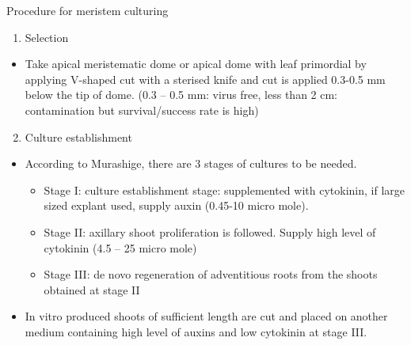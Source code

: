 \documentclass[
  ignorenonframetext,
  aspectratio=169]{beamer}
\providecommand{\tightlist}{%
  \setlength{\itemsep}{0pt}\setlength{\parskip}{0pt}}
\begin{document}
\begin{frame}{Procedure for meristem culturing}
\protect\hypertarget{procedure-for-meristem-culturing}{}
\begin{enumerate}
\tightlist
\item
  Selection
\end{enumerate}

\begin{itemize}
\tightlist
\item
  Take apical meristematic dome or apical dome with leaf primordial by
  applying V-shaped cut with a sterised knife and cut is applied 0.3-0.5
  mm below the tip of dome. (0.3 -- 0.5 mm: virus free, less than 2 cm:
  contamination but survival/success rate is high)
\end{itemize}
\end{frame}

\begin{frame}{}
\protect\hypertarget{section-15}{}
\begin{enumerate}
\setcounter{enumi}{1}
\tightlist
\item
  Culture establishment
\end{enumerate}

\begin{itemize}
\tightlist
\item
  According to Murashige, there are 3 stages of cultures to be needed.

  \begin{itemize}
  \tightlist
  \item
    Stage I: culture establishment stage: supplemented with cytokinin,
    if large sized explant used, supply auxin (0.45-10 micro mole).
  \item
    Stage II: axillary shoot proliferation is followed. Supply high
    level of cytokinin (4.5 -- 25 micro mole)
  \item
    Stage III: de novo regeneration of adventitious roots from the
    shoots obtained at stage II
  \end{itemize}
\item
  In vitro produced shoots of sufficient length are cut and placed on
  another medium containing high level of auxins and low cytokinin at
  stage III.
\end{itemize}
\end{frame}
\end{document}

